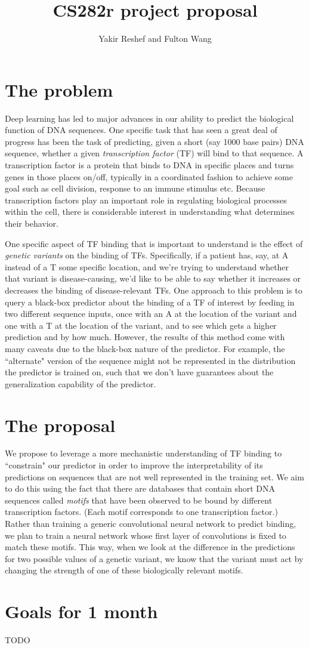 \documentclass[11pt]{amsart}
\title{CS282r project proposal}
\author{Yakir Reshef and Fulton Wang}
\begin{document}
\maketitle
\section{The problem}
Deep learning has led to major advances in our ability to predict the biological function of DNA sequences. One specific task that has seen a great deal of progress has been the task of predicting, given a short (say 1000 base pairs) DNA sequence, whether a given {\em transcription factor} (TF) will bind to that sequence. A transcription factor is a protein that binds to DNA in specific places and turns genes in those places on/off, typically in a coordinated fashion to achieve some goal such as cell division, response to an immune stimulus etc. Because transcription factors play an important role in regulating biological processes within the cell, there is considerable interest in understanding what determines their behavior.

One specific aspect of TF binding that is important to understand is the effect of {\em genetic variants} on the binding of TFs. Specifically, if a patient has, say, at A instead of a T some specific location, and we're trying to understand whether that variant is disease-causing, we'd like to be able to say whether it increases or decreases the binding of disease-relevant TFs. One approach to this problem is to query a black-box predictor about the binding of a TF of interest by feeding in two different sequence inputs, once with an A at the location of the variant and one with a T at the location of the variant, and to see which gets a higher prediction and by how much. However, the results of this method come with many caveats due to the black-box nature of the predictor. For example, the ``alternate" version of the sequence might not be represented in the distribution the predictor is trained on, such that we don't have guarantees about the generalization capability of the predictor.

\section{The proposal}
We propose to leverage a more mechanistic understanding of TF binding to ``constrain" our predictor in order to improve the interpretability of its predictions on sequences that are not well represented in the training set. We aim to do this using the fact that there are databases that contain short DNA sequences called {\em motifs} that have been observed to be bound by different transcription factors. (Each motif corresponds to one transcription factor.) Rather than training a generic convolutional neural network to predict binding, we plan to train a neural network whose first layer of convolutions is fixed to match these motifs. This way, when we look at the difference in the predictions for two possible values of a genetic variant, we know that the variant must act by changing the strength of one of these biologically relevant motifs.

\section{Goals for 1 month}
TODO
\end{document}
